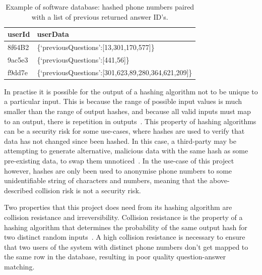 \documentclass{article}
\begin{document}
\begin{table}
\begin{center}
    \begin{tabular}{| l | l |}
    \hline
    userId & userData \\ \hline
    8f64B2 & \{‘previousQuestions’:[13,301,170,577]\} \\ \hline
    9ac5e3 & \{‘previousQuestions’:[441,56]\} \\ \hline
    f9dd7e & \{‘previousQuestions’:[301,623,89,280,364,621,209]\} \\
    \hline
    \end{tabular}
    \caption{Example of software database: hashed phone numbers paired with a list of previous returned answer ID's. }
    \label{table:hashDatabase}
\end{center}
\end{table}

In practise it is possible for the output of a hashing algorithm not to be unique to a particular input.  This is because the range of possible input values is much smaller than the range of output hashes, and because all valid inputs must map to an output, there is repetition in outputs~\cite{mitCryptographyMd5}.  This property of hashing algorithms can be a security risk for some use-cases, where hashes are used to verify that data has not changed since been hashed.  In this case, a third-party may be attempting to generate alternative, malicious data with the same hash as some pre-existing data, to swap them unnoticed~\cite{securityEngineeringHashingAnderson}.  In the use-case of this project however, hashes are only been used to anonymise phone numbers to some unidentifiable string of characters and numbers, meaning that the above-described collision risk is not a security risk.

Two properties that this project does need from its hashing algorithm are collision resistance and irreversibility.  Collision resistance is the property of a hashing algorithm that determines the probability of the same output hash for two distinct random inputs~\cite{mitCryptographyMd5}.  A high collision resistance is necessary to ensure that two users of the system with distinct phone numbers don't get mapped to the same row in the database, resulting in poor quality question-answer matching.
\end{document}
